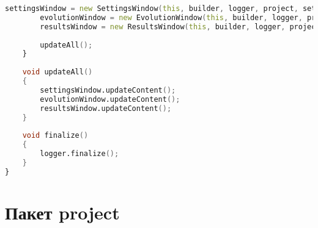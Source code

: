 \documentclass[russian,utf8,emptystyle]{eskdtext}
\begin{document}
\begin{lstlisting}[language=D]
        settingsWindow = new SettingsWindow(this, builder, logger, project, settingsWnd, evolutionWnd, resultsWnd);
        evolutionWindow = new EvolutionWindow(this, builder, logger, project, settingsWnd, evolutionWnd, resultsWnd);
        resultsWindow = new ResultsWindow(this, builder, logger, project, settingsWnd, evolutionWnd, resultsWnd);
        
        updateAll();
    }
    
    void updateAll()
    {
        settingsWindow.updateContent();
        evolutionWindow.updateContent();
        resultsWindow.updateContent();
    }
    
    void finalize()
    {
        logger.finalize();
    }
}
\end{lstlisting}

\section{Пакет project}
\end{document}
